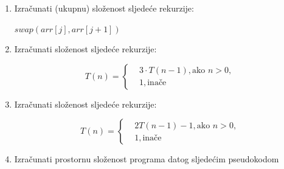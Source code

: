 \begin{enumerate}
\begin{algorithm}[H]
	\begin{algorithmic}[1]
	  \State $sum \gets 0$
                      \State	$sum \gets sum + 1$
                 
                  \EndFor
              \EndIf
          \EndFor
     \EndFor
    \EndProcedure
	\end{algorithmic}
\end{algorithm}


 
 \item Izračunati (ukupnu) složenost sljedeće rekurzije:

\begin{algorithm}[H]
	\begin{algorithmic}[1]
 	  
 		        \State $swap( arr [j] , arr [j+1] )$
 		      \EndIf
 		   \EndFor
 	    \EndFor
		\EndProcedure
	\end{algorithmic}
\end{algorithm}



 
	 
 \item Izračunati složenost sljedeće rekurzije: %
  
 $$	T(n) = 
 \begin{cases}    
         &3\cdot T(n-1), \text{ako }  n > 0 , \\
         & 1, \text{inače} 
   \end{cases}$$

  \item Izračunati složenost sljedeće rekurzije:

$$	T(n) = 
\begin{cases} 
  		&2T(n-1) - 1, \text{ako } n>0, \\
		& 1, \text{inače}
\end{cases}
$$

\item Izračunati prostornu složenost programa datog sljedećim pseudokodom


\end{enumerate}
